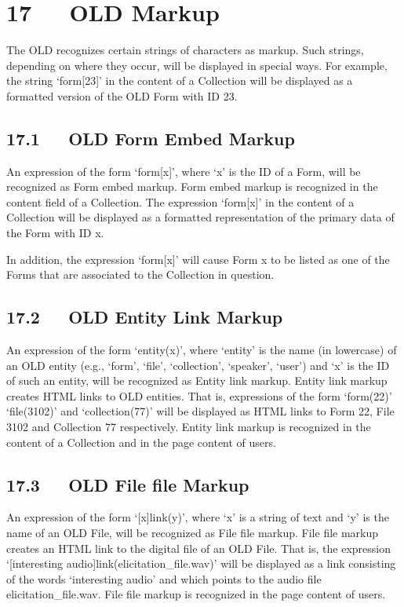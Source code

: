 \documentclass[letterpaper,10pt,english]{sphinxmanual}
\begin{document}
\chapter{17   OLD Markup}
\label{user_guide:old-markup}
The OLD recognizes certain strings of characters as markup.  Such strings,
depending on where they occur, will be displayed in special ways.  For example,
the string `form{[}23{]}' in the content of a Collection will be displayed as a
formatted version of the OLD Form with ID 23.


\section{17.1   OLD Form Embed Markup}
\label{user_guide:old-form-embed-markup}
An expression of the form `form{[}x{]}', where `x' is the ID of a Form, will be
recognized as Form embed markup.  Form embed markup is recognized in
the content field of a Collection.  The expression `form{[}x{]}' in the content of
a Collection will be displayed as a formatted representation of the primary data
of the Form with ID x.

In addition, the expression `form{[}x{]}' will cause Form x to be listed as one of
the Forms that are associated to the Collection in question.


\section{17.2   OLD Entity Link Markup}
\label{user_guide:old-entity-link-markup}
An expression of the form `entity(x)', where `entity' is the name (in lowercase)
of an OLD entity (e.g., `form', `file', `collection', `speaker', `user') and `x'
is the ID of such an entity, will be recognized as Entity link markup.
Entity link markup creates HTML links to OLD entities.  That is,
expressions of the form `form(22)' `file(3102)' and `collection(77)' will be
displayed as HTML links to Form 22, File 3102 and Collection 77 respectively.
Entity link markup is recognized in the content of a Collection and in the
page content of users.


\section{17.3   OLD File file Markup}
\label{user_guide:old-file-file-markup}
An expression of the form `{[}x{]}link(y)', where `x' is a string of text and `y'
is the name of an OLD File, will be recognized as File file markup.  File file
markup creates an HTML link to the digital file of an OLD File.  That is,
the expression `{[}interesting audio{]}link(elicitation\_file.wav)' will be
displayed as a link consisting of the words `interesting audio' and which points
to the audio file elicitation\_file.wav.  File file markup is recognized in the
page content of users.
\end{document}
